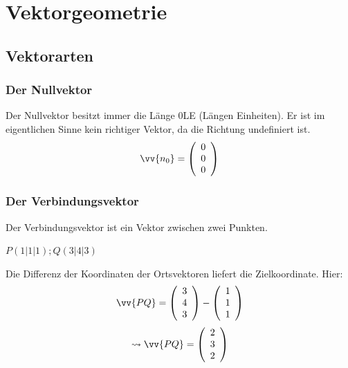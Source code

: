 \documentclass[a4paper, 15pt]{article}
\begin{document}
\section{Vektorgeometrie}
\subsection{Vektorarten}
\subsubsection{Der Nullvektor}
Der Nullvektor besitzt immer die Länge 0LE (Längen Einheiten). Er ist im eigentlichen Sinne kein richtiger Vektor, da die Richtung undefiniert ist.
\begin{equation*}
\vv{n_0}= \left(\begin{array}{c} 0 \\ 0 \\ 0 \end{array}\right)
\end{equation*}
\subsubsection{Der Verbindungsvektor}
\begin{minipage}{.49\textwidth}
Der Verbindungsvektor ist ein Vektor zwischen zwei Punkten.
\begin{center}
$P(1|1|1); Q(3|4|3)$
\end{center}
Die Differenz der Koordinaten der Ortsvektoren liefert die Zielkoordinate. Hier:
\begin{equation*}
\vv{PQ}= \left(\begin{array}{c} 3 \\ 4 \\ 3 \end{array}\right) - \left(\begin{array}{c} 1 \\ 1 \\ 1 \end{array}\right)
\end{equation*}
\begin{equation*}
\leadsto\vv{PQ}= \left(\begin{array}{c} 2 \\ 3 \\ 2 \end{array}\right)
\end{equation*}
\end{minipage}
\begin{minipage}{.49\textwidth}
\flushright
\begin{center}
\end{center}
\end{minipage}
\end{document}
